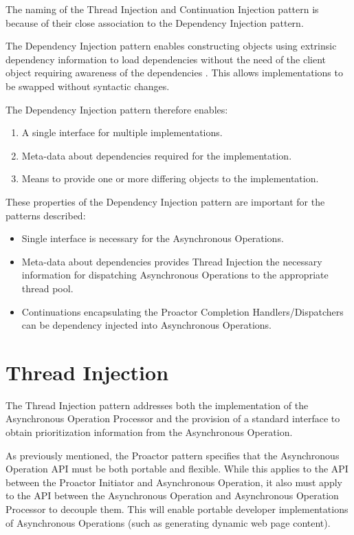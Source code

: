 \documentclass[prodmode]{style/acmlarge}
\begin{document}
The naming of the Thread Injection and Continuation Injection pattern is because
of their close association to the Dependency Injection pattern.

The Dependency Injection pattern enables constructing objects using extrinsic
dependency information to load dependencies without the need of the client
object requiring awareness of the dependencies \cite{ioc}.  This allows
implementations to be swapped without syntactic changes.

The Dependency Injection pattern therefore enables:
\begin{enumerate}
  \item A single interface for multiple implementations.
  \item Meta-data about dependencies required for the implementation.
  \item Means to provide one or more differing objects to the implementation.
\end{enumerate}

These properties of the Dependency Injection pattern are important for the
patterns described:
\begin{itemize}
  \item Single interface is necessary for the Asynchronous Operations.
  \item Meta-data about dependencies provides Thread Injection the necessary information for dispatching Asynchronous Operations to the appropriate thread pool.
  \item Continuations encapsulating the Proactor Completion Handlers/Dispatchers can be dependency injected into Asynchronous Operations.
\end{itemize}


\section{Thread Injection}

The Thread Injection pattern addresses both the implementation of the
Asynchronous Operation Processor and the provision of a standard interface to
obtain prioritization information from the Asynchronous Operation.

As previously mentioned, the Proactor pattern specifies that the Asynchronous
Operation API must be both portable and flexible.  While this applies to the API
between the Proactor Initiator and Asynchronous Operation, it also must apply to
the API between the Asynchronous Operation and Asynchronous Operation Processor
to decouple them.  This will enable portable developer implementations of
Asynchronous Operations (such as generating dynamic web page content). 
\end{document}
